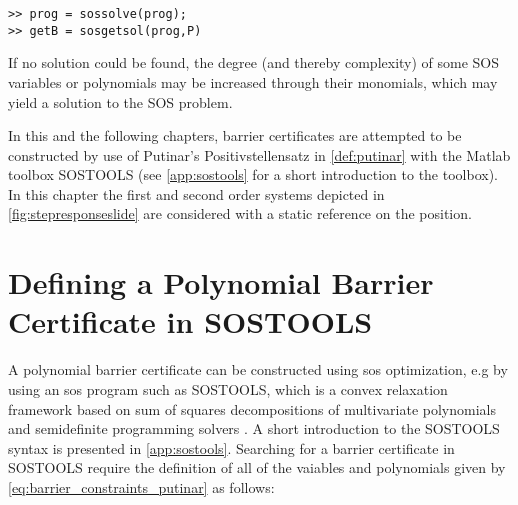 \hspace*{1cm} \texttt{>> prog = sossolve(prog);}\\
\hspace*{1cm} \texttt{>> getB = sosgetsol(prog,P)}




If no solution could be found, the degree (and thereby complexity) of some SOS variables or polynomials may be increased through their monomials, which may yield a solution to the SOS problem.

In this and the following chapters, barrier certificates are attempted to be constructed by use of Putinar's Positivstellensatz in \autoref{def:putinar} with the Matlab toolbox SOSTOOLS (see \autoref{app:sostools} for a short introduction to the toolbox). In this chapter the first and second order systems depicted in \autoref{fig:stepresponseslide} are considered with a static reference on the position.

\section{Defining a Polynomial Barrier Certificate in SOSTOOLS}\label{sec:app_sostools_barrier_search}

A polynomial barrier certificate can be constructed using \gls{sos} optimization, e.g by using an \gls{sos} program such as SOSTOOLS, which is a convex relaxation framework based on sum of squares decompositions of multivariate polynomials and semidefinite programming solvers \citep{bib:prajna_framework}. A short introduction to the SOSTOOLS syntax is presented in \autoref{app:sostools}.
Searching for a barrier certificate in SOSTOOLS require the definition of all of the vaiables and polynomials given by \autoref{eq:barrier_constraints_putinar} as follows:

